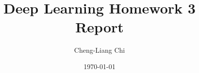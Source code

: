 \documentclass[12pt,a4paper]{article}
\title{Deep Learning Homework 3 Report}
\author{Cheng-Liang Chi}
\date{\today}
\begin{document}
\maketitle
\tableofcontents
\newpage






\nocite{Hank891008}
\printbibliography
\end{document}
